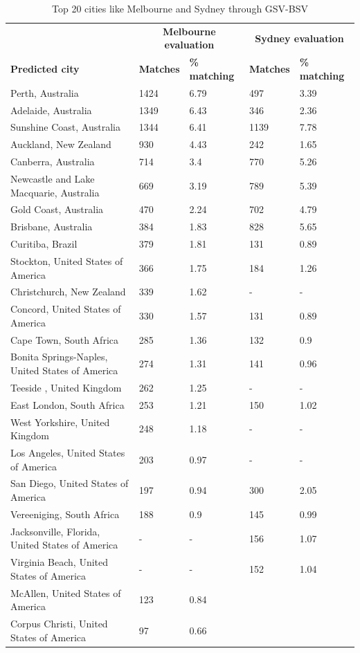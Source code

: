 \documentclass[sageh,times]{sagej}
\begin{document}
\begin{table}[!htbp]
\caption{Top 20 cities like Melbourne and Sydney through GSV-BSV \label{tab:melbournesydneyGSV}}     
\begin{tabular}{| l | l |l| l | l|}
\hline
 \hline    &  \multicolumn{2}{c|}{\textbf{Melbourne evaluation}} & \multicolumn{2}{c|}{\textbf{Sydney evaluation}}  \\  
\textbf{Predicted city} & \textbf{Matches} & \textbf{\% matching}  & \textbf{Matches} & \textbf{\% matching}\\ \hline

Perth, Australia & 1424 & 6.79 & 497 & 3.39 \\ \hline
Adelaide, Australia & 1349 & 6.43 & 346 & 2.36 \\ \hline
Sunshine Coast, Australia & 1344 & 6.41 & 1139 & 7.78 \\ \hline
Auckland, New Zealand & 930 & 4.43 & 242 & 1.65 \\ \hline
Canberra, Australia & 714 & 3.4 & 770 & 5.26 \\ \hline
Newcastle and Lake Macquarie, Australia & 669 & 3.19 & 789 & 5.39 \\ \hline
Gold Coast, Australia & 470 & 2.24 & 702 & 4.79 \\ \hline
Brisbane, Australia & 384 & 1.83 & 828 & 5.65 \\ \hline
Curitiba, Brazil & 379 & 1.81 & 131 & 0.89 \\ \hline
Stockton, United States of America & 366 & 1.75 & 184 & 1.26 \\ \hline
Christchurch, New Zealand & 339 & 1.62 &-&- \\ \hline
Concord, United States of America & 330 & 1.57 & 131 & 0.89 \\ \hline
Cape Town, South Africa & 285 & 1.36 & 132 & 0.9 \\ \hline
Bonita Springs-Naples, United States of America & 274 & 1.31 & 141 & 0.96 \\ \hline
Teeside , United Kingdom & 262 & 1.25 &-&- \\ \hline
East London, South Africa & 253 & 1.21 & 150 & 1.02 \\ \hline
West Yorkshire, United Kingdom & 248 & 1.18 &-&- \\ \hline
Los Angeles, United States of America & 203 & 0.97 &-&- \\ \hline
San Diego, United States of America & 197 & 0.94 & 300 & 2.05 \\ \hline
Vereeniging, South Africa & 188 & 0.9 & 145 & 0.99 \\ \hline
Jacksonville, Florida, United States of America  &-&- & 156 & 1.07\\ \hline
Virginia Beach, United States of America  &-&- & 152 & 1.04\\ \hline
McAllen, United States of America & 123 & 0.84\\ \hline
Corpus Christi, United States of America & 97 & 0.66\\ \hline

\end{tabular}
\end{table}
\end{document}
